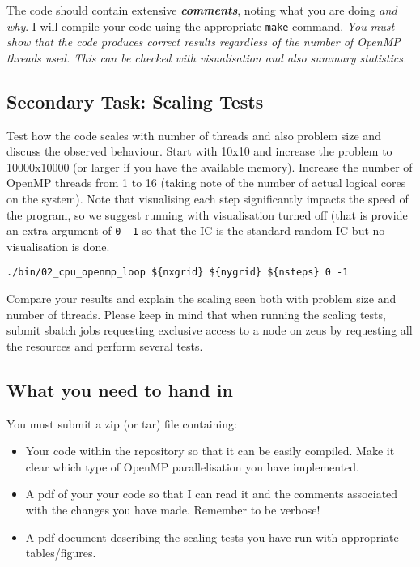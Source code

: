 \documentclass[11pt]{amsart}
\begin{document}
The code should contain extensive \textbf{\textit{comments}}, noting what you are doing \textit{and why}. I will compile your code using the appropriate \texttt{make} command. 
{\centering \textit{You must show that the code produces correct results regardless of the number of OpenMP threads used. This can be checked with visualisation and also summary statistics.}} 

\subsection{{\color{Red}Secondary Task}: Scaling Tests\nopunct\\}\label{sec:tasks:scaling}
Test how the code scales with number of threads and also problem size and discuss the observed behaviour. Start with 10x10 and increase the problem to 10000x10000 (or larger if you have the available memory). Increase the number of OpenMP threads from 1 to 16 (taking note of the number of actual logical cores on the system). Note that visualising each step significantly impacts the speed of the program, so we suggest running with visualisation turned off (that is provide an extra argument of \texttt{0 -1} so that the IC is the standard random IC but no visualisation is done. 
\begin{center}
\begin{minipage}{0.95\textwidth}
\begin{verbatim}
./bin/02_cpu_openmp_loop ${nxgrid} ${nygrid} ${nsteps} 0 -1
\end{verbatim}
\end{minipage}
\end{center}
Compare your results and explain the scaling seen both with problem size and number of threads. Please keep in mind that when running the scaling tests, submit sbatch jobs requesting exclusive access to a node on zeus by requesting all the resources and perform several tests. 

\subsection{{\color{Blue}What you need to hand in\nopunct\\}}\label{sec:tasks:handin}
You must submit a zip (or tar) file containing: 
\begin{itemize} 
\item Your code within the repository so that it can be easily compiled. Make it clear which type of OpenMP parallelisation you have implemented. 
\item A pdf of your your code so that I can read it and the comments associated with the changes you have made. Remember to be verbose!
\item A pdf document describing the scaling tests you have run with appropriate tables/figures. 
\end{itemize}
\end{document}
